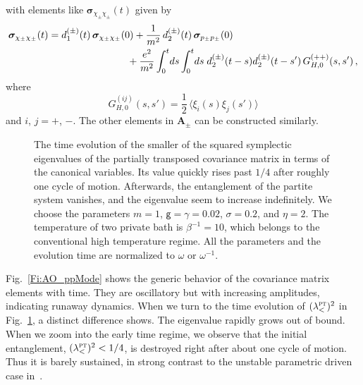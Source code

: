 \documentclass[11pt,a4paper]{article}
\begin{document}
with elements like $\bm{\sigma}_{\chi_{\pm}\chi_{\pm}}(t)$ given by
\begin{align}
    \bm{\sigma}_{\chi_{\pm}\chi_{\pm}}(t)&=d_1^{(\pm)}(t)\,\bm{\sigma}_{\chi_{\pm}\chi_{\pm}}(0)+\frac{1}{m^2}\,d_2^{(\pm)}(t)\,\bm{\sigma}_{p_{\pm}p_{\pm}}(0)\notag\\
    &\qquad\qquad\qquad\qquad+\frac{e^2}{m^2}\int_0^t\!ds\int_0^t\!ds\;d_2^{(\pm)}(t-s)d_2^{(\pm)}(t-s')\,G_{H,0}^{(++)}(s,s')\,,
\end{align}    
where
\begin{equation}
    G_{H,0}^{(ij)}(s,s')=\frac{1}{2}\,\langle\xi_i(s)\xi_j(s')\rangle
\end{equation}
and $i$, $j=+$, $-$. The other elements in $\bm{A}_\pm$ can be constructed similarly.


\begin{figure}
\centering
    \caption{The time evolution of the smaller of the squared symplectic eigenvalues of the partially transposed covariance matrix in terms of the canonical variables. Its value quickly rises past $1/4$ after roughly one cycle of motion. Afterwards, the entanglement of the partite system vanishes, and the eigenvalue seem to increase indefinitely. We choose the parameters $m=1$, $\mathsf{g}=\gamma=0.02$, $\sigma=0.2$, and $\eta=2$. The temperature of two private bath is $\beta^{-1}=10$, which belongs to the conventional high temperature regime. All the parameters and the evolution time are normalized to $\omega$ or $\omega^{-1}$.}\label{Fi:AO_sympPT}
\end{figure}

Fig.~\ref{Fi:AO_ppMode} shows the generic behavior of the covariance matrix elements with time. They are oscillatory but with increasing amplitudes, indicating runaway dynamics. When we turn to the time evolution of $(\lambda_{<}^{\textsc{pt}})^{2}$ in Fig.~\ref{Fi:AO_sympPT},  a distinct difference shows. The eigenvalue rapidly grows out of bound. When we zoom into the early time regime, we observe that the initial entanglement, $(\lambda_{<}^{\textsc{pt}})^{2}<1/4$, is destroyed right after about one cycle of motion. Thus it is barely sustained, in strong contrast to the unstable parametric driven case in~\cite{galve-prl}.
 
\end{document}
